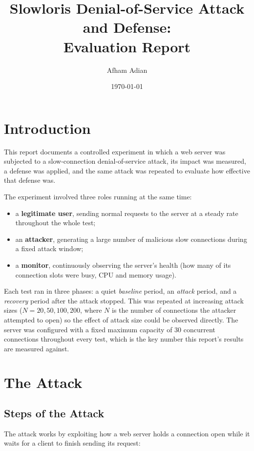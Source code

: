 \documentclass[11pt]{article}
\title{Slowloris Denial-of-Service Attack and Defense: \\ Evaluation Report}
\author{Afham Adian}
\date{\today}
\begin{document}
\maketitle

\section{Introduction}

This report documents a controlled experiment in which a web server was
subjected to a slow-connection denial-of-service attack, its impact was
measured, a defense was applied, and the same attack was repeated to
evaluate how effective that defense was.

The experiment involved three roles running at the same time:

\begin{itemize}
    \item a \textbf{legitimate user}, sending normal requests to the server
    at a steady rate throughout the whole test;
    \item an \textbf{attacker}, generating a large number of malicious
    slow connections during a fixed attack window;
    \item a \textbf{monitor}, continuously observing the server's health
    (how many of its connection slots were busy, CPU and memory usage).
\end{itemize}

Each test ran in three phases: a quiet \emph{baseline} period, an
\emph{attack} period, and a \emph{recovery} period after the attack
stopped. This was repeated at increasing attack sizes ($N = 20, 50, 100,
200$, where $N$ is the number of connections the attacker attempted to
open) so the effect of attack size could be observed directly. The server
was configured with a fixed maximum capacity of 30 concurrent
connections throughout every test, which is the key number this report's
results are measured against.

\section{The Attack}

\subsection{Steps of the Attack}

The attack works by exploiting how a web server holds a connection open
while it waits for a client to finish sending its request:
\end{document}
